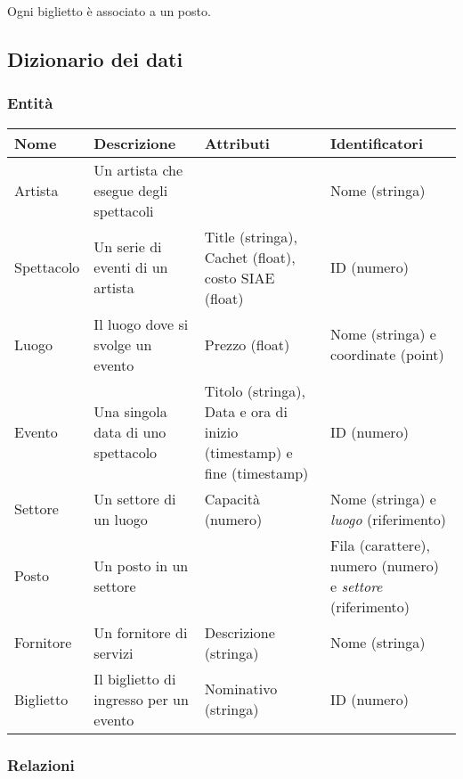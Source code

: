 \documentclass[a4paper,11pt]{article}
\begin{document}
Ogni biglietto è associato a un posto.


\subsection{Dizionario dei dati}

\subsubsection*{Entità}

\begin{tabularx}{\textwidth}{|X|>{\raggedright\arraybackslash}X|>{\raggedright\arraybackslash}X|>{\raggedright\arraybackslash}X|}
\hline
\textbf{Nome} & \textbf{Descrizione} & \textbf{Attributi} & \textbf{Identificatori}\\
\hline
Artista & Un artista che esegue degli spettacoli & & Nome (stringa)\\
\hline
Spettacolo & Un serie di eventi di un artista & Title (stringa), Cachet (float), costo SIAE (float) & ID (numero)\\
\hline
Luogo & Il luogo dove si svolge un evento & Prezzo (float) & Nome (stringa) e coordinate (point)\\
\hline
Evento & Una singola data di uno spettacolo & Titolo (stringa), Data e ora di inizio (timestamp) e fine (timestamp) & ID (numero)\\
\hline
Settore & Un settore di un luogo & Capacità (numero) & Nome (stringa) e \textit{luogo} (riferimento)\\
\hline
Posto & Un posto in un settore & & Fila (carattere), numero (numero) e \textit{settore} (riferimento)\\
\hline
Fornitore & Un fornitore di servizi & Descrizione (stringa) & Nome (stringa)\\
\hline
Biglietto & Il biglietto di ingresso per un evento & Nominativo (stringa) & ID (numero)\\
\hline
\end{tabularx}

\subsubsection*{Relazioni}
\end{document}
